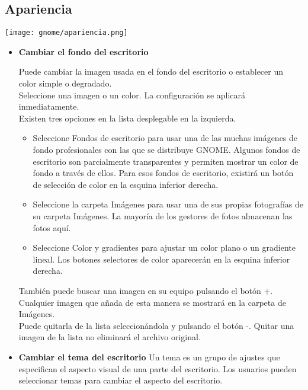 \documentclass[12pt,letterpaper]{book}
\begin{document}
	\subsection{Apariencia}
	\begin{center}
	\texttt{[image: gnome/apariencia.png]}
	\end{center}	
		\begin{itemize}
			\item {\large \bf Cambiar el fondo del escritorio}
				
					Puede cambiar la imagen usada en el fondo del escritorio o establecer un color simple o degradado.\\

Seleccione una imagen o un color. La configuración se aplicará inmediatamente.\\

Existen tres opciones en la lista desplegable en la izquierda.
\begin{itemize}
\item Seleccione Fondos de escritorio para usar una de las muchas imágenes de fondo profesionales con las que se distribuye GNOME. Algunos fondos de escritorio son parcialmente transparentes y permiten mostrar un color de fondo a través de ellos. Para esos fondos de escritorio, existirá un botón de selección de color en la esquina inferior derecha.
\item Seleccione la carpeta Imágenes para usar una de sus propias fotografías de su carpeta Imágenes. La mayoría de los gestores de fotos almacenan las fotos aquí.
\item Seleccione Color y gradientes para ajustar un color plano o un gradiente lineal. Los botones selectores de color aparecerán en la esquina inferior derecha.
\end{itemize}
También puede buscar una imagen en su equipo pulsando el botón +. Cualquier imagen que añada de esta manera se mostrará en la carpeta de Imágenes.\\
Puede quitarla de la lista seleccionándola y pulsando el botón -. Quitar una imagen de la lista no eliminará el archivo original.

			\item {\large \bf Cambiar el tema del escritorio}
			Un tema es un grupo de ajustes que especifican el aspecto visual de una parte del escritorio. Los usuarios pueden seleccionar temas para cambiar el aspecto del escritorio.\\


\end{itemize}
\end{document}
